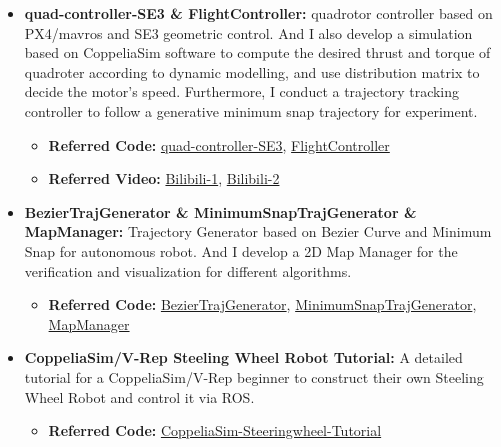 \documentclass[11pt,a4paper,sans]{moderncv}        %
\begin{document}
{\begin{itemize}
\vspace{6pt}

\item \textbf{quad-controller-SE3 \& FlightController:} quadrotor controller based on PX4/mavros and SE3 geometric control. And I also develop a simulation based on CoppeliaSim software to compute the desired thrust and torque of quadroter according to dynamic modelling, and use distribution matrix to decide the motor's speed. Furthermore, I conduct a trajectory tracking controller to follow a generative minimum snap trajectory for experiment.

\begin{itemize}
\item \textbf{Referred Code:} \href{https://github.com/jianhengLiu/quad_controller_SE3}{quad-controller-SE3}, \href{https://github.com/jianhengLiu/FlightController}{FlightController}

\item \textbf{Referred Video:} \href{https://www.bilibili.com/video/BV1xv411w7Md?share_source=copy_web}{Bilibili-1}, \href{https://www.bilibili.com/video/BV1rq4y1N76T?share_source=copy_web}{Bilibili-2}
\end{itemize}

\vspace{6pt}

\item \textbf{BezierTrajGenerator \& MinimumSnapTrajGenerator \& 
MapManager:} Trajectory Generator based on Bezier Curve and Minimum Snap for autonomous robot. And I develop a 2D Map Manager for the verification and visualization for different algorithms.

\begin{itemize}
\item \textbf{Referred Code:} \href{https://github.com/jianhengLiu/BezierTrajGenerator}{BezierTrajGenerator}, \href{https://github.com/jianhengLiu/MinimumSnapTrajGenerator}{MinimumSnapTrajGenerator}, \href{https://github.com/jianhengLiu/MapManager}{MapManager}
\end{itemize}

\vspace{6pt}

\item \textbf{CoppeliaSim/V-Rep Steeling Wheel Robot Tutorial:} A detailed tutorial for a CoppeliaSim/V-Rep beginner to construct their own Steeling Wheel Robot and control it via ROS.

\begin{itemize}
\item \textbf{Referred Code:} \href{https://github.com/jianhengLiu/CoppeliaSim_Steeringwheel_Tutorial}{CoppeliaSim-Steeringwheel-Tutorial}
\end{itemize}
\vspace{6pt}


\end{itemize}}
\end{document}
